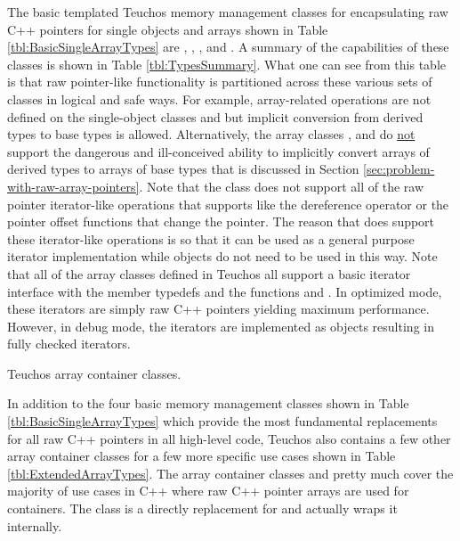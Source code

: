 \documentclass[pdf,ps2pdf,11pt]{SANDreport}
\begin{document}
The basic templated Teuchos memory management classes for
encapsulating raw C++ pointers for single objects and arrays shown in
Table {}\ref{tbl:BasicSingleArrayTypes} are {}, {},
{}, and {}.  A summary of the
capabilities of these classes is shown in Table
{}\ref{tbl:TypesSummary}.  What one can see from this table is that
raw pointer-like functionality is partitioned across these various
sets of classes in logical and safe ways.  For example, array-related
operations are not defined on the single-object classes {}
and {} but implicit conversion from derived types to base
types is allowed.  Alternatively, the array classes {},
and {} do {}\underline{not} support the dangerous and
ill-conceived ability to implicitly convert arrays of derived types to
arrays of base types that is discussed in Section
{}\ref{sec:problem-with-raw-array-pointers}.  Note that the class
{} does not support all of the raw pointer
iterator-like operations that {} supports like the
dereference operator {} or the pointer offset
functions that change the pointer.  The reason that {}
does support these iterator-like operations is so that it can be used
as a general purpose iterator implementation while {}
objects do not need to be used in this way.  Note that all of the
array classes defined in Teuchos all support a basic iterator
interface with the {} member typedefs and the
functions {} and {}.  In optimized mode, these
iterators are simply raw C++ pointers yielding maximum performance.
However, in debug mode, the iterators are implemented as
{} objects resulting in fully checked iterators.

\begin{table}
\begin{center}

\end{center}
\caption{\label{tbl:ExtendedArrayTypes}
Teuchos array container classes.}
\end{table}

In addition to the four basic memory management classes shown in Table
{}\ref{tbl:BasicSingleArrayTypes} which provide the most fundamental
replacements for all raw C++ pointers in all high-level code, Teuchos
also contains a few other array container classes for a few more
specific use cases shown in Table {}\ref{tbl:ExtendedArrayTypes}.  The
array container classes {} and {} pretty much
cover the majority of use cases in C++ where raw C++ pointer arrays
are used for containers.  The class {} is a directly
replacement for {} and actually wraps it internally.
\end{document}
